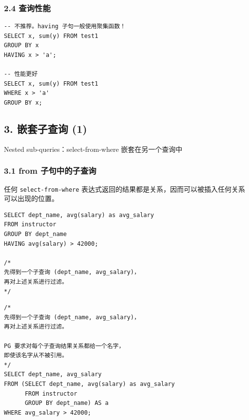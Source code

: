 \documentclass[aspectratio=169, 14pt]{beamer}
\begin{document}
\begin{frame}[fragile]
	\frametitle{2.4 查询性能}
	\begin{verbatim} 
-- 不推荐。having 子句一般使用聚集函数！
SELECT x, sum(y) FROM test1 
GROUP BY x 
HAVING x > 'a';

-- 性能更好
SELECT x, sum(y) FROM test1 
WHERE x > 'a'
GROUP BY x;
    \end{verbatim}



\end{frame}

\begin{frame}[fragile]
	\section{\textcolor{darkmidnightblue}{3. 嵌套子查询 (1)}}
	Nested sub-queries：\alert{select-from-where} 嵌套在另一个查询中

\end{frame}

\begin{frame}[fragile]
	\frametitle{3.1 from 子句中的子查询}
	任何 \texttt{select-from-where} 表达式返回的结果都是关系，因而可以被插入任何关系可以出现的位置。

	\begin{verbatim}
SELECT dept_name, avg(salary) as avg_salary
FROM instructor
GROUP BY dept_name
HAVING avg(salary) > 42000;

/*
先得到一个子查询 (dept_name, avg_salary)，
再对上述关系进行过滤。
*/
    \end{verbatim}

\end{frame}

\begin{frame}[fragile]

	\begin{verbatim}
/*
先得到一个子查询 (dept_name, avg_salary)，
再对上述关系进行过滤。

PG 要求对每个子查询结果关系都给一个名字，
即使该名字从不被引用。
*/
SELECT dept_name, avg_salary
FROM (SELECT dept_name, avg(salary) as avg_salary
      FROM instructor
      GROUP BY dept_name) AS a
WHERE avg_salary > 42000;
    \end{verbatim}

\end{frame}
\end{document}
